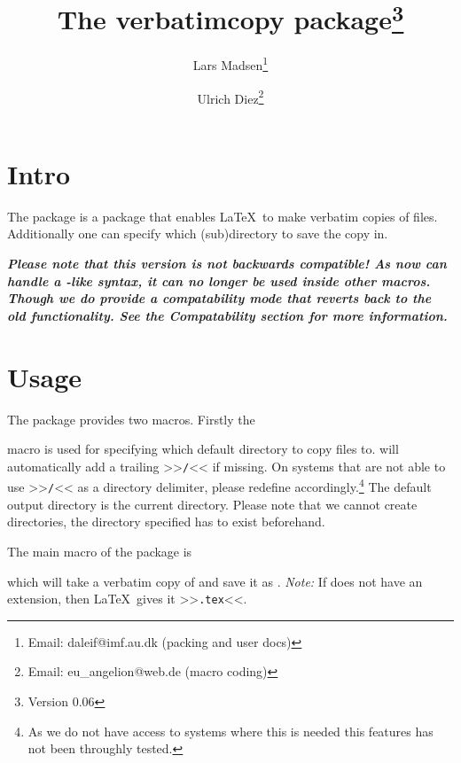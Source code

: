 \documentclass[11pt,a4paper,oldfontcommands,danish,english,article,oneside]{memoir}
\begin{document}
\title{The \textsf{verbatimcopy} package\thanks{Version 0.06}}
\author{Lars Madsen\thanks{Email: daleif@imf.au.dk (packing and user docs)}
\and Ulrich Diez\thanks{Email: eu\_angelion@web.de (macro coding)}
}
\maketitle

\section{Intro}

The \textsf{\jobname} package is a package that enables \LaTeX\ to
make verbatim copies of files. Additionally one can specify which
(sub)directory to save the copy in. 

\textcolor{nicered}{\itshape\bfseries Please note that this version is
not backwards compatible! As  now can
handle a -like syntax, it can no longer be used inside other
macros. Though we do provide a compatability mode that reverts back to
the old functionality. See the \emph{Compatability} section for more
information.
}
\section{Usage}


The package provides two macros. Firstly the
\begin{syntax}
\end{syntax}
macro is used for specifying which default directory to copy files to.
 will automatically add a trailing
>>\texttt{/}<< if missing.
On systems that are not able to use >>\texttt{/}<< as a directory
delimiter, please redefine 
accordingly.\footnote{As we do not have access to systems where this
  is needed this features has not been throughly tested.}
The default output directory is the current directory. Please note
that we cannot create directories, the directory specified has to
exist beforehand.


The main macro of the package is
\begin{syntax}
\end{syntax}
which will take a verbatim copy of  and save it as
. \textit{Note:} If  does not have
an extension, then \LaTeX\ gives it >>\texttt{.tex}<<.
\end{document}
